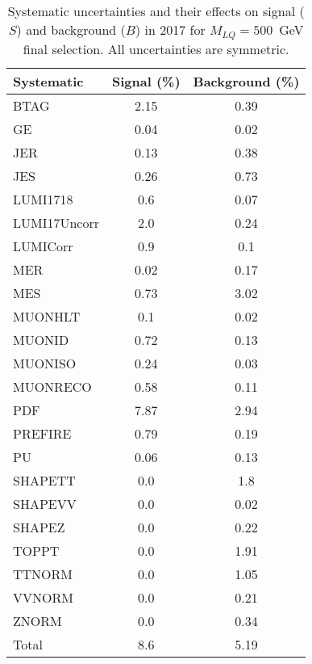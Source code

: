 \begin{table}[htbp]
\begin{center}
\caption{Systematic uncertainties and their effects on signal ($S$) and background ($B$) in 2017 for $M_{LQ}=500$~GeV final selection. All uncertainties are symmetric.}
\begin{tabular}{lcc}
\hline\hline
Systematic & Signal (\%) & Background (\%) \\ \hline 
BTAG & 2.15 & 0.39\\ 
GE & 0.04 & 0.02\\ 
JER & 0.13 & 0.38\\ 
JES & 0.26 & 0.73\\ 
LUMI1718 & 0.6 & 0.07\\ 
LUMI17Uncorr & 2.0 & 0.24\\ 
LUMICorr & 0.9 & 0.1\\ 
MER & 0.02 & 0.17\\ 
MES & 0.73 & 3.02\\ 
MUONHLT & 0.1 & 0.02\\ 
MUONID & 0.72 & 0.13\\ 
MUONISO & 0.24 & 0.03\\ 
MUONRECO & 0.58 & 0.11\\ 
PDF & 7.87 & 2.94\\ 
PREFIRE & 0.79 & 0.19\\ 
PU & 0.06 & 0.13\\ 
SHAPETT & 0.0 & 1.8\\ 
SHAPEVV & 0.0 & 0.02\\ 
SHAPEZ & 0.0 & 0.22\\ 
TOPPT & 0.0 & 1.91\\ 
TTNORM & 0.0 & 1.05\\ 
VVNORM & 0.0 & 0.21\\ 
ZNORM & 0.0 & 0.34\\ 
Total & 8.6 & 5.19\\ \hline \hline
\end{tabular}
\label{tab:SysUncertainties_uujj_500}
\end{center}
\end{table}

